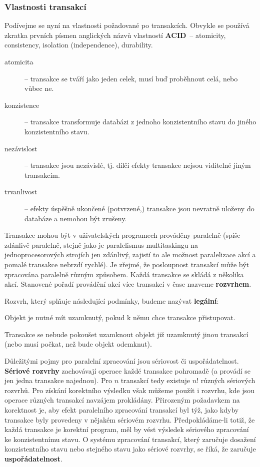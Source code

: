 \subsubsection*{Vlastnosti transakcí}

Podívejme se nyní na vlastnosti požadované po transakcích. Obvykle se používá
zkratka prvních písmen anglických názvů vlastností \textbf{ACID}~-- atomicity,
consistency, isolation (independence), durability. 
\begin{description}
  \item[atomicita] -- transakce se tváří jako jeden celek, musí buď proběhnout
  celá, nebo vůbec ne.
  \item[konzistence] -- transakce transformuje databázi z jednoho konzistentního
  stavu do jiného konzistentního stavu.
  \item[nezávislost] -- transakce jsou nezávislé, tj. dílčí efekty transakce
  nejsou viditelné jiným transakcím.
  \item[trvanlivost] -- efekty úspěšně ukončené (potvrzené,)
  transakce jsou nevratně uloženy do databáze a nemohou být zrušeny.
\end{description}

Transakce mohou být v uživatelských programech prováděny paralelně (spíše
zdánlivě paralelně, stejně jako je paralelismus multitaskingu na jednoprocesorových
strojích jen zdánlivý, zajistí to ale možnost paralelizace  
akcí a pomalé transakce nebrzdí rychlé). Je
zřejmé, že posloupnost transakcí může být zpracována paralelně různým způsobem.
Každá transakce se skládá z několika akcí. Stanovené pořadí provádění akcí
více transakcí v čase nazveme \textbf{rozvrhem}.

Rozvrh, který splňuje následující podmínky, budeme nazývat \textbf{legální}:
\begin{pitemize}
  \item Objekt je nutné mít uzamknutý, pokud k němu chce transakce přistupovat.
  \item Transakce se nebude pokoušet uzamknout objekt již uzamknutý jinou
  transakcí (nebo musí počkat, než bude objekt odemknut).
\end{pitemize}

Důležitými pojmy pro paralelní zpracování jsou sériovost či uspořádatelnost.
\textbf{Sériové rozvrhy} zachovávají operace každé transakce pohromadě (a 
provádí se jen jedna transakce najednou). Pro $n$
transakcí tedy existuje $n!$ různých sériových rozvrhů. Pro získání korektního
výsledku však můžeme použít i rozvrhu, kde jsou operace různých transakcí
navzájem prokládány.
Přirozeným požadavkem na korektnost je, aby efekt paralelního zpracování
transakcí byl týž, jako kdyby transakce byly provedeny v nějakém sériovém rozvrhu.
Předpokládáme-li totiž, že každá transakce je korektní program, měl by vést
výsledek sériového zpracování ke konzistentnímu stavu. O systému zpracování
transakcí, který zaručuje dosažení konzistentního stavu nebo stejného stavu
jako sériové rozvrhy, se říká, že zaručuje \textbf{uspořádatelnost}.

